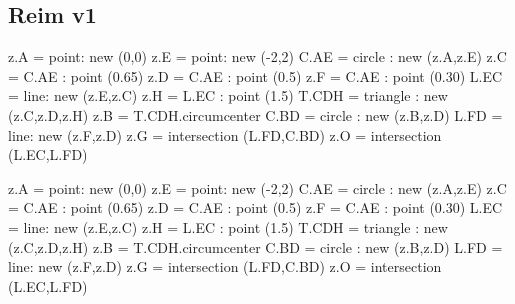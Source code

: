 \subsection{Reim v1} %
\label{sub:reim_v1}
\begin{tkzexample}[latex=0cm,small,code only]
\begin{tkzelements}
   z.A     = point: new (0,0)
   z.E     = point: new (-2,2)
   C.AE    = circle :   new (z.A,z.E)
   z.C     = C.AE : point (0.65)
   z.D     = C.AE : point (0.5)
   z.F     = C.AE : point (0.30)
   L.EC    = line: new (z.E,z.C)
   z.H     = L.EC : point (1.5)
   T.CDH   = triangle : new (z.C,z.D,z.H)
   z.B     = T.CDH.circumcenter
   C.BD    = circle : new (z.B,z.D)
   L.FD    = line: new (z.F,z.D)
   z.G     = intersection (L.FD,C.BD)
   z.O     = intersection (L.EC,L.FD)
\end{tkzelements}
\end{tkzexample}

\begin{tkzelements}
   z.A     = point: new (0,0)
   z.E     = point: new (-2,2)
   C.AE    = circle :   new (z.A,z.E)
   z.C     = C.AE : point (0.65)
   z.D     = C.AE : point (0.5)
   z.F     = C.AE : point (0.30)
   L.EC    = line: new (z.E,z.C)
   z.H     = L.EC : point (1.5)
   T.CDH   = triangle : new (z.C,z.D,z.H)
   z.B     = T.CDH.circumcenter
   C.BD    = circle : new (z.B,z.D)
   L.FD    = line: new (z.F,z.D)
   z.G     = intersection (L.FD,C.BD)
   z.O     = intersection (L.EC,L.FD)
\end{tkzelements}

\hspace*{\fill}
\hspace*{\fill}

